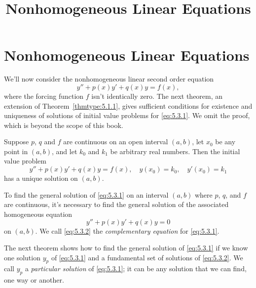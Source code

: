 \documentclass{ximera}
\title{Nonhomogeneous Linear Equations}
\begin{document}
\begin{abstract}

\end{abstract}

\maketitle

\section*{Nonhomogeneous Linear Equations}

We'll now consider the nonhomogeneous linear second order equation
\begin{equation} \label{eq:5.3.1}
y''+p(x)y'+q(x)y=f(x),
\end{equation}
where the forcing function $f$ isn't  identically zero. The next
theorem, an extension of Theorem~\ref{thmtype:5.1.1}, gives sufficient
conditions for existence and uniqueness of solutions of initial value
problems for \eqref{eq:5.3.1}. We omit the proof, which is beyond the
scope of this book.

\begin{theorem}\label{thmtype:5.3.1}
Suppose $p$, $q$ and $f$ are continuous on an open interval
$(a,b)$, let $x_0$ be any point in $(a,b)$, and let $k_0$ and $k_1$ be
arbitrary real numbers. Then the initial value problem
$$
y''+p(x)y'+q(x)y=f(x), \quad  y(x_0)=k_0,\quad y'(x_0)=k_1
$$
 has a unique solution  on $(a,b)$.
\end{theorem}

To find the general solution of  \eqref{eq:5.3.1}
on an interval $(a,b)$ where $p$, $q$, and $f$ are continuous,
it's necessary to find the general solution  of
 the associated homogeneous equation
\begin{equation} \label{eq:5.3.2}
y''+p(x)y'+q(x)y=0
\end{equation}
on $(a,b)$. We call \eqref{eq:5.3.2} the \textit{complementary equation}
for \eqref{eq:5.3.1}.

The next theorem shows how to find the general solution of
\eqref{eq:5.3.1} if we know one solution $y_p$ of \eqref{eq:5.3.1} and a
fundamental set of solutions of \eqref{eq:5.3.2}. We call
$y_p$ a \textit{particular solution} of \eqref{eq:5.3.1};   it
can be any solution that we can find,  one way or another.
\end{document}
